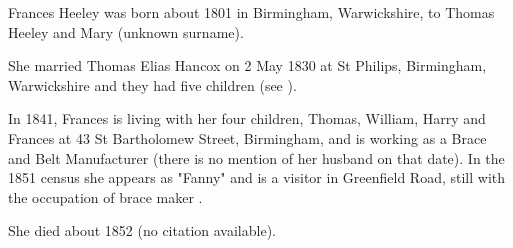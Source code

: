 
Frances Heeley was born about 1801 in Birmingham, Warwickshire, to Thomas Heeley and Mary (unknown surname).  

She married Thomas Elias Hancox on 2 May 1830 at St Philips, Birmingham, Warwickshire and they had five children (see ).	

In 1841, Frances is living with her four children, Thomas, William, Harry and Frances at 43 St Bartholomew Street, Birmingham,   and is working as a Brace and Belt Manufacturer  \cite{FrancesHeeleyWork} (there is no mention of her husband on that date).  In the 1851 census she appears as "Fanny" and is a visitor in Greenfield Road, still with the occupation of brace maker .

She died about 1852 (no citation available).
